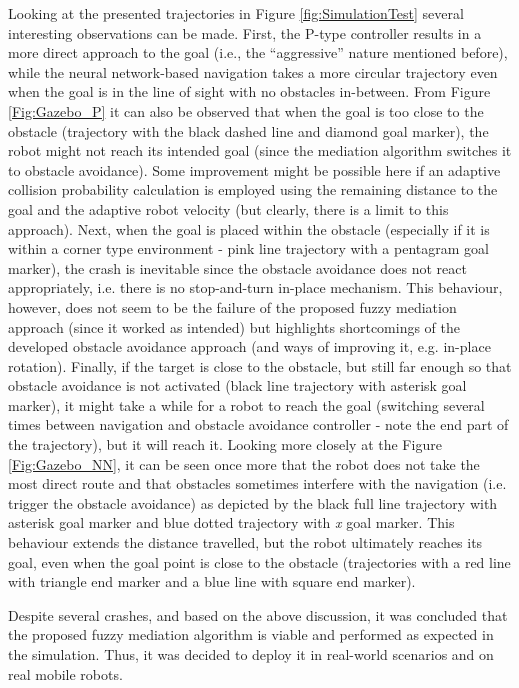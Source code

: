 Looking at the presented trajectories in Figure \ref{fig:SimulationTest} several interesting observations can be made. First, the P-type controller results in a more direct approach to the goal (i.e., the ``aggressive'' nature mentioned before), while the neural network-based navigation takes a more circular trajectory even when the goal is in the line of sight with no obstacles in-between. From Figure \ref{Fig:Gazebo_P} it can also be observed that when the goal is too close to the obstacle (trajectory with the black dashed line and diamond goal marker), the robot might not reach its intended goal (since the mediation algorithm switches it to obstacle avoidance). Some improvement might be possible here if an adaptive collision probability calculation is employed using the remaining distance to the goal and the adaptive robot velocity (but clearly, there is a limit to this approach). Next, when the goal is placed within the obstacle (especially if it is within a corner type environment - pink line trajectory with a pentagram goal marker), the crash is inevitable since the obstacle avoidance does not react appropriately, i.e. there is no stop-and-turn in-place mechanism. This behaviour, however, does not seem to be the failure of the proposed fuzzy mediation approach (since it worked as intended) but highlights shortcomings of the developed obstacle avoidance approach (and ways of improving it, e.g. in-place rotation). Finally, if the target is close to the obstacle, but still far enough so that obstacle avoidance is not activated (black line trajectory with asterisk goal marker), it might take a while for a robot to reach the goal (switching several times between navigation and obstacle avoidance controller - note the end part of the trajectory), but it will reach it. Looking more closely at the Figure \ref{Fig:Gazebo_NN}, it can be seen once more that the robot does not take the most direct route and that obstacles sometimes interfere with the navigation (i.e. trigger the obstacle avoidance) as depicted by the black full line trajectory with asterisk goal marker and blue dotted trajectory with \emph{x} goal marker. This behaviour extends the distance travelled, but the robot ultimately reaches its goal, even when the goal point is close to the obstacle (trajectories with a red line with triangle end marker and a blue line with square end marker).

Despite several crashes, and based on the above discussion, it was concluded that the proposed fuzzy mediation algorithm is viable and performed as expected in the simulation. Thus, it was decided to deploy it in real-world scenarios and on real mobile robots.


